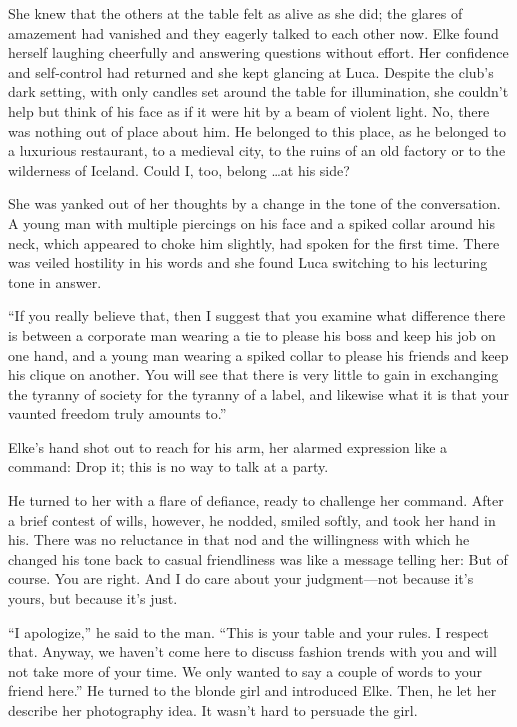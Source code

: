 She knew that the others at the table felt as alive as she did; the glares of amazement had vanished and they eagerly talked to each other now. Elke found herself laughing cheerfully and answering questions without effort. Her confidence and self-control had returned and she kept glancing at Luca. Despite the club's dark setting, with only candles set around the table for illumination, she couldn't help but think of his face as if it were hit by a beam of violent light. No, there was nothing out of place about him. He belonged to this place, as he belonged to a luxurious restaurant, to a medieval city, to the ruins of an old factory or to the wilderness of Iceland. Could I, too, belong \ldots at his side?

She was yanked out of her thoughts by a change in the tone of the conversation. A young man with multiple piercings on his face and a spiked collar around his neck, which appeared to choke him slightly, had spoken for the first time. There was veiled hostility in his words and she found Luca switching to his lecturing tone in answer.

``If you really believe that, then I suggest that you examine what difference there is between a corporate man wearing a tie to please his boss and keep his job on one hand, and a young man wearing a spiked collar to please his friends and keep his clique on another. You will see that there is very little to gain in exchanging the tyranny of society for the tyranny of a label, and likewise what it is that your vaunted freedom truly amounts to.''

Elke's hand shot out to reach for his arm, her alarmed expression like a command: Drop it; this is no way to talk at a party.

He turned to her with a flare of defiance, ready to challenge her command. After a brief contest of wills, however, he nodded, smiled softly, and took her hand in his. There was no reluctance in that nod and the willingness with which he changed his tone back to casual friendliness was like a message telling her: But of course. You are right. And I do care about your judgment---not because it's yours, but because it's just.

``I apologize,'' he said to the man. ``This is your table and your rules. I respect that. Anyway, we haven't come here to discuss fashion trends with you and will not take more of your time. We only wanted to say a couple of words to your friend here.'' He turned to the blonde girl and introduced Elke. Then, he let her describe her photography idea. It wasn't hard to persuade the girl.

